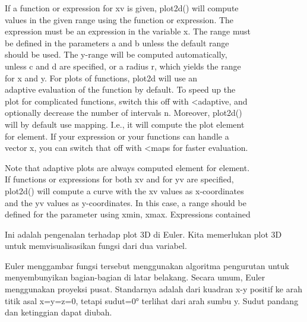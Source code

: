 \documentclass[a4paper,10pt]{article}
\begin{document}
\begin{eulernotebook}
\begin{eulercomment}
\begin{eulercomment}
\begin{eulercomment}
\begin{eulercomment}
\begin{eulercomment}
\begin{eulercomment}
\begin{eulercomment}
\begin{eulercomment}
\begin{eulercomment}
\begin{eulercomment}
\begin{eulercomment}
If a function or expression for xv is given, plot2d() will compute\\
values in the given range using the function or expression. The\\
expression must be an expression in the variable x. The range must\\
be defined in the parameters a and b unless the default range\\
[-2,2] should be used. The y-range will be computed automatically,\\
unless c and d are specified, or a radius r, which yields the range\\
[-r,r] for x and y. For plots of functions, plot2d will use an\\
adaptive evaluation of the function by default. To speed up the\\
plot for complicated functions, switch this off with \textless{}adaptive, and\\
optionally decrease the number of intervals n. Moreover, plot2d()\\
will by default use mapping. I.e., it will compute the plot element\\
for element. If your expression or your functions can handle a\\
vector x, you can switch that off with \textless{}maps for faster evaluation.

Note that adaptive plots are always computed element for element. \\
If functions or expressions for both xv and for yv are specified,\\
plot2d() will compute a curve with the xv values as x-coordinates\\
and the yv values as y-coordinates. In this case, a range should be\\
defined for the parameter using xmin, xmax. Expressions contained
\end{eulercomment}
\begin{eulercomment}
Ini adalah pengenalan terhadap plot 3D di Euler. Kita memerlukan plot
3D untuk memvisualisasikan fungsi dari dua variabel.

Euler menggambar fungsi tersebut menggunakan algoritma pengurutan
untuk menyembunyikan bagian-bagian di latar belakang. Secara umum,
Euler menggunakan proyeksi pusat. Standarnya adalah dari kuadran x-y
positif ke arah titik asal x=y=z=0, tetapi sudut=0° terlihat dari arah
sumbu y. Sudut pandang dan ketinggian dapat diubah.


\end{eulercomment}
\end{eulercomment}
\end{eulercomment}
\end{eulercomment}
\end{eulercomment}
\end{eulercomment}
\end{eulercomment}
\end{eulercomment}
\end{eulercomment}
\end{eulercomment}
\end{eulercomment}
\end{eulernotebook}
\end{document}
